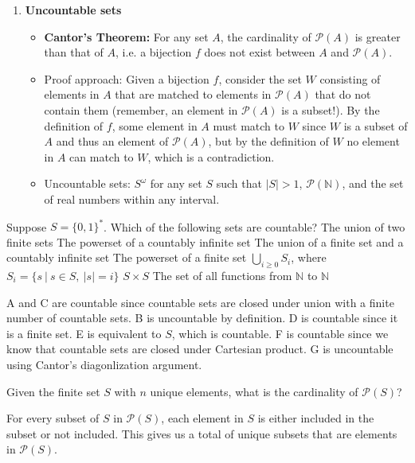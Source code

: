 \documentclass[solution, letterpaper]{cs20inclass}
\begin{document}
\begin{enumerate}
\item \textbf{Uncountable sets}
\begin{itemize}
\item {\bf Cantor's Theorem:} For any set $A$, the cardinality of $\mathcal{P}(A)$ is greater than that of $A$, i.e. a bijection $f$ does not exist between $A$ and $\mathcal{P}(A)$.
\item Proof approach: Given a bijection $f$, consider the set $W$ consisting of elements in $A$ that are matched to elements in $\mathcal{P}(A)$ that do not contain them (remember, an element in $\mathcal{P}(A)$ is a subset!). By the definition of $f$, some element in $A$ must match to $W$ since $W$ is a subset of $A$ and thus an element of $\mathcal{P}(A)$, but by the definition of $W$ no element in $A$ can match to $W$, which is a contradiction.
\item Uncountable sets: $S^\omega$ for any set $S$ such that $|S|>1$, $\mathcal{P}(\mathbb{N})$, and the set of real numbers within any interval.
\end{itemize}

\end{enumerate}
\pagebreak

\problem Suppose $S=\{0,1\}^*$. Which of the following sets are countable?
\subproblem The union of two finite sets
\subproblem The powerset of a countably infinite set
\subproblem The union of a finite set and a countably infinite set
\subproblem The powerset of a finite set
\subproblem $\bigcup_{i\geq 0} S_i$, where $S_i=\{s\ | \ s \in S, \ |s|=i\}$
\subproblem $S \times S$
\subproblem The set of all functions from $\mathbb{N}$ to $\mathbb{N}$


\begin{solution}
A and C are countable since countable sets are closed under union with a finite number of countable sets. B is uncountable by definition. D is countable since it is a finite set. E is equivalent to $S$, which is countable. F is countable since we know that countable sets are closed under Cartesian product. G is uncountable using Cantor's diagonlization argument.
\end{solution}

\problem Given the finite set $S$ with $n$ unique elements, what is the cardinality of $\mathcal{P}(S)$?

\begin{solution}
For every subset of $S$ in $\mathcal{P}(S)$, each element in $S$ is either included in the subset or not included. This gives us a total of  unique subsets that are elements in $\mathcal{P}(S)$.
\end{solution}
\end{document}
